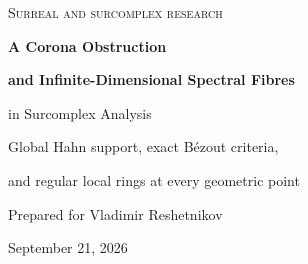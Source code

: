 \documentclass[11pt,letterpaper]{article}
\numberwithin{equation}{section}
\theoremstyle{definition}
\theoremstyle{remark}
\newcommand{\C}{\mathbb C}
\newcommand{\R}{\mathbb R}
\newcommand{\No}{\mathbf{No}}
\newcommand{\OO}{\mathcal O}
\newcommand{\HH}{\mathcal H}
\begin{document}
\begin{titlepage}
\centering
\vspace*{0.25in}
{\large\scshape Surreal and surcomplex research\par}
\vspace{0.32in}
{\Huge\bfseries A Corona Obstruction\par}
\vspace{0.10in}
{\LARGE\bfseries and Infinite-Dimensional Spectral Fibres\par}
\vspace{0.12in}
{\LARGE in Surcomplex Analysis\par}
\vspace{0.25in}
{\large Global Hahn support, exact B\'ezout criteria,\par and regular local rings at every geometric point\par}
\vspace{0.25in}
{\large Prepared for Vladimir Reshetnikov\par}
{\normalsize September 21, 2026\par}
\vspace{0.25in}
\begin{minipage}{0.96\textwidth}
\begin{abstract}
\noindent
Fix the ordinary unit disk $D$ and the set-sized surcomplex field
$K=\C((t^{\R}))\subset\No[i]$, with $t^r=\omega^{-r}$. We investigate
$\HH=\OO(D)((t^{\R}))$: the algebra of Hahn series whose coefficients are
holomorphic on the \emph{same fixed disk}. It is a complete uniform
non-Archimedean Banach $K$-algebra, and its norm is the supremum of its
values at actual finite surcomplex points over $D$. Nevertheless, we give
explicit $h,F\in\HH$ with norms at most one and
\[
 \inf_{z\in D^{\sharp}}\max\{|h(z)|_v,|F(z)|_v\}=e^{-2}>0
\]
for which $hU+FV=1$ has no solution in $\HH$; the distance from $1$ to
$(h,F)$ is exactly one. The obstruction survives every enlargement of the
Hahn value group. An exact criterion explains it: modulo a fixed ordinary
simple discrete divisor, a nowhere-zero value family is invertible
precisely when its set of leading valuations is finite.


\end{abstract}
\end{minipage}
\end{titlepage}
\end{document}
